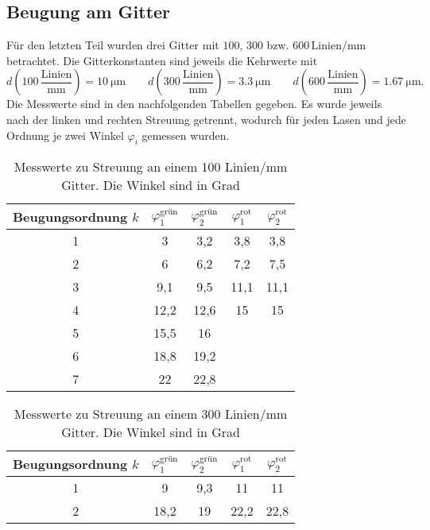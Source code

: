 \subsection{Beugung am Gitter}
\label{sec:Beugung am Gitter}
Für den letzten Teil wurden drei Gitter mit $100$, $300$ bzw. $600
\,\text{Linien}/\si{\milli\meter}$ betrachtet. Die Gitterkonstanten sind jeweils die
Kehrwerte mit
\begin{equation}
	d\left(100 \, \frac{\text{Linien}}{\si{\milli\meter}} \right) 
	= \SI{10}{\micro\meter}
	\qquad
	d\left(300 \, \frac{\text{Linien}}{\si{\milli\meter}} \right) 
	= \SI{3,3}{\micro\meter}
	\qquad
	d\left(600 \, \frac{\text{Linien}}{\si{\milli\meter}} \right) 
	= \SI{1,67}{\micro\meter}.
\end{equation}
Die Messwerte sind in den nachfolgenden Tabellen gegeben. Es wurde jeweils nach der linken
und rechten Streuung getrennt, wodurch für jeden Lasen und jede Ordnung je zwei Winkel
$\varphi_i$ gemessen wurden.
\begin{table}
	\centering
	\caption{Messwerte zu Streuung an einem 100 Linien/mm Gitter. Die Winkel sind in
	Grad}
	\label{tab:messwerte-gitter100}
	\begin{tabular}{c c c c c}
		\toprule
		Beugungsordnung $k$ &
		$\varphi_1^\text{grün}$ &
		$\varphi_2^\text{grün}$ &
		$\varphi_1^\text{rot}$ &
		$\varphi_2^\text{rot}$ \\
		\midrule
		1 & 3    & 3,2  &  3,8 & 3,8 \\
		2 & 6    & 6,2  &  7,2 & 7,5 \\
		3 & 9,1  & 9,5  & 11,1 & 11,1 \\
		4 & 12,2 & 12,6 & 15   & 15 \\
		5 & 15,5 & 16 \\
		6 & 18,8 & 19,2 \\
		7 & 22   & 22,8 \\
		\bottomrule
	\end{tabular}
\end{table}
\begin{table}
	\centering
	\caption{Messwerte zu Streuung an einem 300 Linien/mm Gitter. Die Winkel sind in
	Grad}
	\label{tab:messwerte-gitter300}
	\begin{tabular}{c c c c c}
		\toprule
		Beugungsordnung $k$ &
		$\varphi_1^\text{grün}$ &
		$\varphi_2^\text{grün}$ &
		$\varphi_1^\text{rot}$ &
		$\varphi_2^\text{rot}$ \\
		\midrule
		1 & 9    & 9,3  &  11   & 11 \\
		2 & 18,2 & 19   &  22,2 & 22,8 \\
		\bottomrule
	\end{tabular}
\end{table}
